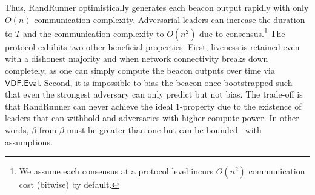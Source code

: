 
Thus, RandRunner optimistically generates each beacon output rapidly with only $O(n)$ communication complexity. Adversarial leaders can increase the \epoch duration to $T$ and the communication complexity to $O(n^2)$ due to consensus.\footnote{We assume each consensus at a protocol level incurs $O(n^2)$ communication cost (bitwise) by default.}
The protocol exhibits two other beneficial properties. First, liveness is retained even with a dishonest majority and when network connectivity breaks down completely, as one can simply compute the beacon outputs over time via $\mathsf{VDF.Eval}$. Second, it is impossible to bias the beacon once bootstrapped such that even the strongest adversary can only predict but not bias. The trade-off is that RandRunner can never achieve the ideal 1-\interunpredictability property due to the existence of leaders that can withhold and adversaries with higher compute power. In other words, $\beta$ from $\beta$-\interunpredictability must be greater than one but can be bounded~\cite{schindler2021randrunner} with assumptions.
